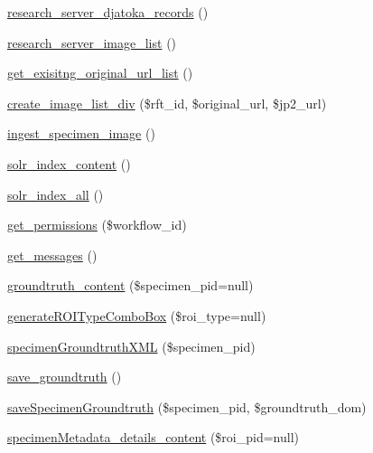 \begin{DoxyCompactItemize}
\item 
\hyperlink{workspace_8functions_8php_a4400883073feeaa376e7a5d300ec6ba3}{research\_\-server\_\-djatoka\_\-records} ()
\item 
\hyperlink{workspace_8functions_8php_ad361b927889bc4fdfef4e2f01cf384dc}{research\_\-server\_\-image\_\-list} ()
\item 
\hyperlink{workspace_8functions_8php_afd4c34745073e420fe7eb937bce76c84}{get\_\-exisitng\_\-original\_\-url\_\-list} ()
\item 
\hyperlink{workspace_8functions_8php_a26e860b17a8534a5a2bb240d494b76c0}{create\_\-image\_\-list\_\-div} (\$rft\_\-id, \$original\_\-url, \$jp2\_\-url)
\item 
\hyperlink{workspace_8functions_8php_ad6f3771cf2c736aca9e2f2eb7a9faeb5}{ingest\_\-specimen\_\-image} ()
\item 
\hyperlink{workspace_8functions_8php_aa907bebbf9d9ff75c35b10ee24d48014}{solr\_\-index\_\-content} ()
\item 
\hyperlink{workspace_8functions_8php_ae9693dc9f84cbbc0af0a55c846368601}{solr\_\-index\_\-all} ()
\item 
\hyperlink{workspace_8functions_8php_af809f04afe95b229e0dc950ce3b6769d}{get\_\-permissions} (\$workflow\_\-id)
\item 
\hyperlink{workspace_8functions_8php_a280fc131731bf4215c07840696bf8800}{get\_\-messages} ()
\item 
\hyperlink{workspace_8functions_8php_a3fcbb2d7c87717858ed2c67810edb332}{groundtruth\_\-content} (\$specimen\_\-pid=null)
\item 
\hyperlink{workspace_8functions_8php_ab9a8172f63d537dbc410950d9d4bb6c7}{generateROITypeComboBox} (\$roi\_\-type=null)
\item 
\hyperlink{workspace_8functions_8php_a825237a28262df1a190ada50bee6cdc3}{specimenGroundtruthXML} (\$specimen\_\-pid)
\item 
\hyperlink{workspace_8functions_8php_aeee9947eee2bb5bdfd11770c7e396f0f}{save\_\-groundtruth} ()
\item 
\hyperlink{workspace_8functions_8php_a45640349162da1bfbf1814e8fbef3c31}{saveSpecimenGroundtruth} (\$specimen\_\-pid, \$groundtruth\_\-dom)
\item 
\hyperlink{workspace_8functions_8php_a514e188b2f9918409ed91f774a9f8299}{specimenMetadata\_\-details\_\-content} (\$roi\_\-pid=null)
\end{DoxyCompactItemize}
